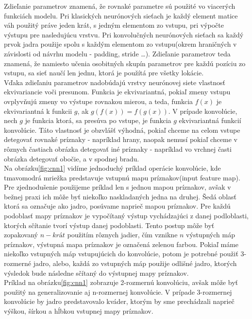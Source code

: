 \indent Zdieľanie parametrov znamená, že rovnaké parametre sú použité vo viacerých funkciách modelu.
Pri klasických neurónových sieťach je každý element matice váh použitý práve jeden krát, s jedným  elementom zo vstupu, pri výpočte výstupu pre nasledujúcu vrstvu.
Pri konvolučných neurónových sieťach sa každý prvok jadra použije spolu s každým elementom zo vstupu(okrem hraničných v závislosti od návrhu modelu - padding, stride \dots). Zdieľanie parametrov teda znamená, že namiesto učenia osobitných skupín parametrov pre každú pozíciu zo vstupu, sa sieť naučí len jednu, ktorá je použítá pre všetky lokácie.\cite{goodfellow2016deep} \\

\indent Vďaka zdieľaniu parametrov nadobúdajú vrstvy neurónovej siete vlastnosť ekvivariancie voči presunom.
Funkcia je ekvivariantná, pokiaľ zmeny vstupu ovplyvňujú zmeny vo výstupe rovnakou mierou, a teda, 
funkcia $f(x)$ je ekvivariantná k funkcii $g$, ak $g(f(x)) = f(g(x))$.
V prípade konvolúcie, nech $g$ je funkcia ktorá, sa presúva po vstupe, je funkcia $g$ ekvivariantná funkcií konvolúcie.
Táto vlastnosť je obzvlášť výhodná, pokiaľ chceme na celom vstupe detegovať rovnaké príznaky - napríklad hrany, naopak nemusí pokiaľ chceme v rôznych častiach obrázka detegovať iné príznaky - napríklad vo vrchnej časti obrázka detegovať obočie, a v spodnej bradu. \cite{goodfellow2016deep} \\

\indent Na obrázku\ref{fig:cnn1} vidíme jednoduchý príklad operácie konvolúcie, kde tmavomodrá mriežka  predstavuje vstupnú mapu príznakov(input feature map).
Pre zjednodušenie použijeme príklad len s jednou mapou príznakov, avšak v bežnej praxi ich môže byť niekoľko naskladaných jedna na druhej.
Šedá oblasť ktorá sa označuje ako jadro, posúvame naprieč mapou príznakov.
Pre každú podoblasť mapy príznakov je vypočítaný výstup vychádzajúci z danej podloblasti, ktorých sčítanie tvorí výstup danej podoblasti.\cite{dumoulin2016guide}
Tento postup môže byť zopakovaný $n-krát$ použitím rôznych jadier, čím vznikne $n$ výstupných máp príznakov, výstupná mapa príznakov je označená zelenou farbou.
Pokiaľ máme niekoľko vstupných máp vstupujúcich do konvolúcie, potom je potrebné použiť 3-rozmerné jadro, alebo, každá zo vstupných máp použije odlišné jadro, ktorých výsledok bude následne sčítaný do výstupnej mapy príznakov.\\
\indent Príklad na obrázku\ref{fig:cnn1} zobrazuje 2-rozmernú konvolúciu, avšak môže byť  použitý na generalizovanie aj n-rozmernej konvolúcie.
V prípade 3-rozmernej konvolúcie by jadro predstavovalo kváder, ktorým by sme prechádzali naprieč výškou, šírkou a hĺbkou vstupnej mapy príznakov.\cite{dumoulin2016guide} \\

